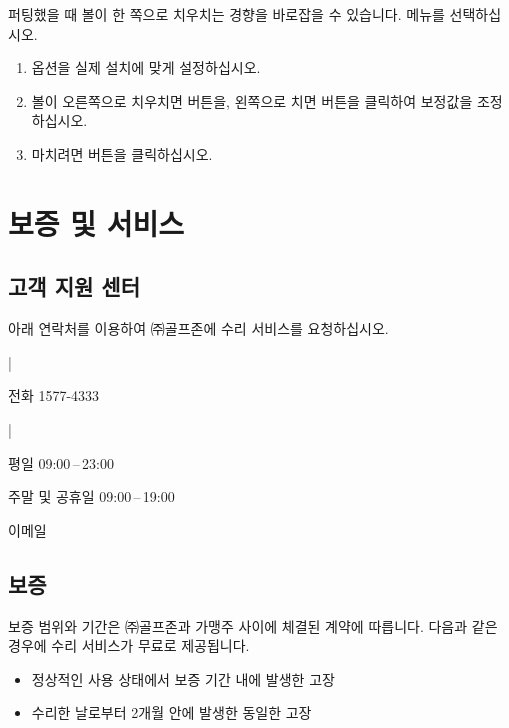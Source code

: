 \documentclass[10pt, openright, language=korean]{hzguide}
\begin{document}
퍼팅했을 때 볼이 한 쪽으로 치우치는 경향을 바로잡을 수 있습니다.
 메뉴를 선택하십시오.


\begin{enumerate}
\item {} 옵션을 실제 설치에 맞게 설정하십시오.
\item 볼이 오른쪽으로 치우치면  버튼을, 왼쪽으로 치면  버튼을 클릭하여 보정값을 조정하십시오.
\item 마치려면  버튼을 클릭하십시오.
\end{enumerate}

\chapter{보증 및 서비스}

\section{고객 지원 센터}

아래 연락처를 이용하여 ㈜골프존에 수리 서비스를 요청하십시오.

\begin{terms}|
\item[전화] 1577-4333
    \begin{terms}|
    \item[평일] 09:00\,--\,23:00
    \item[주말 및 공휴일] 09:00\,--\,19:00
    \end{terms}
\item[이메일] 
\end{terms}

\section{보증}

보증 범위와 기간은 ㈜골프존과 가맹주 사이에 체결된 계약에 따릅니다.
다음과 같은 경우에 수리 서비스가 무료로 제공됩니다.

\begin{itemize}
\item 정상적인 사용 상태에서 보증 기간 내에 발생한 고장
\item 수리한 날로부터 2개월 안에 발생한 동일한 고장
\end{itemize}
\end{document}
